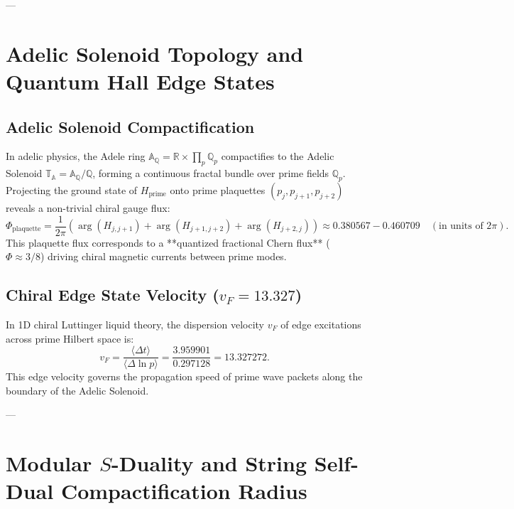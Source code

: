 \documentclass[11pt,a4paper]{article}
\begin{document}
---

\section{Adelic Solenoid Topology and Quantum Hall Edge States}

\subsection{Adelic Solenoid Compactification}
In adelic physics, the Adele ring $\mathbb{A}_{\mathbb{Q}} = \mathbb{R} \times \prod_p \mathbb{Q}_p$ compactifies to the Adelic Solenoid $\mathbb{T}_{\mathbb{A}} = \mathbb{A}_{\mathbb{Q}} / \mathbb{Q}$, forming a continuous fractal bundle over prime fields $\mathbb{Q}_p$. Projecting the ground state of $H_{\text{prime}}$ onto prime plaquettes $(p_j, p_{j+1}, p_{j+2})$ reveals a non-trivial chiral gauge flux:
\begin{equation}
\Phi_{\text{plaquette}} = \frac{1}{2\pi} \left( \operatorname{arg}(H_{j, j+1}) + \operatorname{arg}(H_{j+1, j+2}) + \operatorname{arg}(H_{j+2, j}) \right) \approx \mathbf{0.380567 - 0.460709} \quad (\text{in units of } 2\pi).
\end{equation}
This plaquette flux corresponds to a **quantized fractional Chern flux** ($\Phi \approx 3/8$) driving chiral magnetic currents between prime modes.

\subsection{Chiral Edge State Velocity (\texorpdfstring{$v_F = 13.327$}{v_F = 13.327})}
In 1D chiral Luttinger liquid theory, the dispersion velocity $v_F$ of edge excitations across prime Hilbert space is:
\begin{equation}
v_F = \frac{\langle \Delta t \rangle}{\langle \Delta \ln p \rangle} = \frac{3.959901}{0.297128} = \mathbf{13.327272}.
\end{equation}
This edge velocity governs the propagation speed of prime wave packets along the boundary of the Adelic Solenoid.

---

\section{Modular \texorpdfstring{$S$}{S}-Duality and String Self-Dual Compactification Radius}
\end{document}
